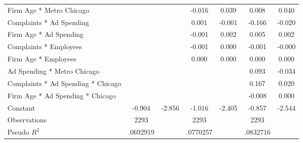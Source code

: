 {\begin{tabular}{l*{6}{c}}
Firm Age * Metro Chicago&                     &                     &      -0.016         &       0.039\sym{*}  &       0.008         &       0.040         \\
Complaints * Ad Spending&                     &                     &       0.001         &      -0.001         &      -0.166         &      -0.020\sym{**} \\
Firm Age * Ad Spending&                     &                     &      -0.001         &       0.002\sym{***}&       0.005\sym{**} &       0.002         \\
Complaints * Employees&                     &                     &      -0.001         &       0.000         &      -0.001         &      -0.000         \\
Firm Age * Employees&                     &                     &       0.000         &       0.000         &       0.000         &       0.000         \\
Ad Spending * Metro Chicago&                     &                     &                     &                     &       0.093\sym{*}  &      -0.034         \\
Complaints * Ad Spending * Chicago&                     &                     &                     &                     &       0.167         &       0.020\sym{**} \\
Firm Age * Ad Spending * Chicago&                     &                     &                     &                     &      -0.008\sym{***}&       0.000         \\
Constant            &      -0.904\sym{***}&      -2.856\sym{***}&      -1.016\sym{***}&      -2.405\sym{***}&      -0.857\sym{***}&      -2.544\sym{***}\\
\midrule
Observations        &        2293         &                     &        2293         &                     &        2293         &                     \\
Pseudo \(R^{2}\)    &    .0692919         &                     &    .0770257         &                     &    .0832716         &                     \\
\bottomrule
\end{tabular}
}
